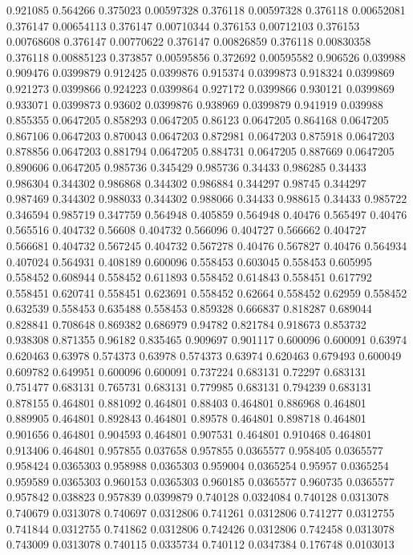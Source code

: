 0.921085 0.564266
0.375023 0.00597328
0.376118 0.00597328
0.376118 0.00652081
0.376147 0.00654113
0.376147 0.00710344
0.376153 0.00712103
0.376153 0.00768608
0.376147 0.00770622
0.376147 0.00826859
0.376118 0.00830358
0.376118 0.00885123
0.373857 0.00595856
0.372692 0.00595582
0.906526 0.039988
0.909476 0.0399879
0.912425 0.0399876
0.915374 0.0399873
0.918324 0.0399869
0.921273 0.0399866
0.924223 0.0399864
0.927172 0.0399866
0.930121 0.0399869
0.933071 0.0399873
0.93602 0.0399876
0.938969 0.0399879
0.941919 0.039988
0.855355 0.0647205
0.858293 0.0647205
0.86123 0.0647205
0.864168 0.0647205
0.867106 0.0647203
0.870043 0.0647203
0.872981 0.0647203
0.875918 0.0647203
0.878856 0.0647203
0.881794 0.0647205
0.884731 0.0647205
0.887669 0.0647205
0.890606 0.0647205
0.985736 0.345429
0.985736 0.34433
0.986285 0.34433
0.986304 0.344302
0.986868 0.344302
0.986884 0.344297
0.98745 0.344297
0.987469 0.344302
0.988033 0.344302
0.988066 0.34433
0.988615 0.34433
0.985722 0.346594
0.985719 0.347759
0.564948 0.405859
0.564948 0.40476
0.565497 0.40476
0.565516 0.404732
0.56608 0.404732
0.566096 0.404727
0.566662 0.404727
0.566681 0.404732
0.567245 0.404732
0.567278 0.40476
0.567827 0.40476
0.564934 0.407024
0.564931 0.408189
0.600096 0.558453
0.603045 0.558453
0.605995 0.558452
0.608944 0.558452
0.611893 0.558452
0.614843 0.558451
0.617792 0.558451
0.620741 0.558451
0.623691 0.558452
0.62664 0.558452
0.62959 0.558452
0.632539 0.558453
0.635488 0.558453
0.859328 0.666837
0.818287 0.689044
0.828841 0.708648
0.869382 0.686979
0.94782 0.821784
0.918673 0.853732
0.938308 0.871355
0.96182 0.835465
0.909697 0.901117
0.600096 0.600091
0.63974 0.620463
0.63978 0.574373
0.63978 0.574373
0.63974 0.620463
0.679493 0.600049
0.609782 0.649951
0.600096 0.600091
0.737224 0.683131
0.72297 0.683131
0.751477 0.683131
0.765731 0.683131
0.779985 0.683131
0.794239 0.683131
0.878155 0.464801
0.881092 0.464801
0.88403 0.464801
0.886968 0.464801
0.889905 0.464801
0.892843 0.464801
0.89578 0.464801
0.898718 0.464801
0.901656 0.464801
0.904593 0.464801
0.907531 0.464801
0.910468 0.464801
0.913406 0.464801
0.957855 0.037658
0.957855 0.0365577
0.958405 0.0365577
0.958424 0.0365303
0.958988 0.0365303
0.959004 0.0365254
0.95957 0.0365254
0.959589 0.0365303
0.960153 0.0365303
0.960185 0.0365577
0.960735 0.0365577
0.957842 0.038823
0.957839 0.0399879
0.740128 0.0324084
0.740128 0.0313078
0.740679 0.0313078
0.740697 0.0312806
0.741261 0.0312806
0.741277 0.0312755
0.741844 0.0312755
0.741862 0.0312806
0.742426 0.0312806
0.742458 0.0313078
0.743009 0.0313078
0.740115 0.0335734
0.740112 0.0347384
0.176748 0.0103013
